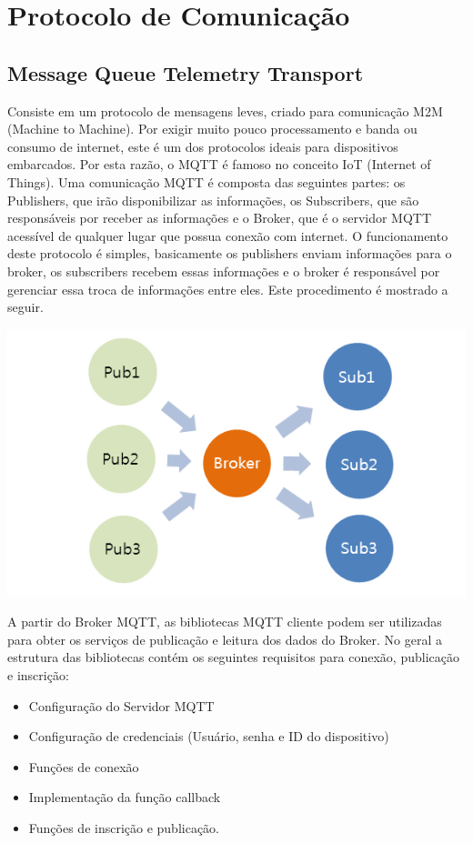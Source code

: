 \section{Protocolo de Comunicação}
\subsection{Message Queue Telemetry Transport}
	Consiste em um protocolo de mensagens leves, criado para comunicação M2M (Machine to Machine). Por exigir muito pouco processamento e banda ou consumo de internet, este é um dos protocolos ideais para dispositivos embarcados. Por esta razão, o MQTT é famoso no conceito IoT (Internet of Things).
	Uma comunicação MQTT é composta das seguintes partes: os Publishers, que irão disponibilizar as informações, os Subscribers, que são responsáveis por receber as informações e o Broker, que é o servidor MQTT acessível de qualquer lugar que possua conexão com internet.
	O funcionamento deste protocolo é simples, basicamente os publishers enviam informações para o broker, os subscribers recebem essas informações e o broker é responsável por gerenciar essa troca de informações entre eles. Este procedimento é mostrado a seguir.
    \begin{center}
    	\includegraphics[scale=0.7]
        {figuras/MQTT-Funcionamento}
        \label{mqtt}
    \end{center}
    
	A partir do Broker MQTT, as bibliotecas MQTT cliente podem ser utilizadas para obter os serviços de publicação e leitura dos dados do Broker. No geral a estrutura das bibliotecas contém os seguintes requisitos para conexão, publicação e inscrição:  
    \begin{itemize}
    \item 
    	Configuração do Servidor MQTT
   	\item
    	Configuração de credenciais (Usuário, senha e ID do dispositivo)
    \item
   	 	Funções de conexão
    \item
   	 	Implementação da função callback
    \item
    	Funções de inscrição e publicação.        
    \end{itemize}
    
